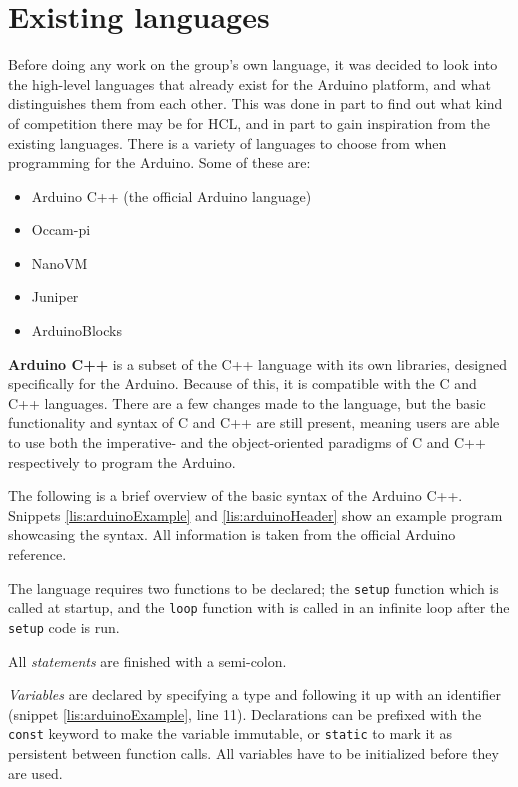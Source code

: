 \section{Existing languages}
Before doing any work on the group's own language, it was decided to look into the high-level languages that already exist for the Arduino platform, and what distinguishes them from each other.
This was done in part to find out what kind of competition there may be for HCL, and in part to gain inspiration from the existing languages.
There is a variety of languages to choose from when programming for the Arduino.
Some of these are:

\begin{itemize}
	\item Arduino C++ (the official Arduino language)
	\item Occam-pi
	\item NanoVM
	\item Juniper
	\item ArduinoBlocks
\end{itemize}

\textbf{Arduino C++} is a subset of the C++ language with its own libraries, designed specifically for the Arduino.
Because of this, it is compatible with the C and C++ languages.
There are a few changes made to the language, but the basic functionality and syntax of C and C++ are still present, meaning users are able to use both the imperative- and the object-oriented paradigms of C and C++ respectively to program the Arduino.

The following is a brief overview of the basic syntax of the Arduino C++.
Snippets \ref{lis:arduinoExample} and \ref{lis:arduinoHeader} show an example program showcasing the syntax.
All information is taken from the official Arduino reference\cite{ArduinoReference}.

The language requires two functions to be declared;
the \texttt{setup} function which is called at startup,
and the \texttt{loop} function with is called in an infinite loop after the \texttt{setup} code is run.

All \textit{statements} are finished with a semi-colon.

\textit{Variables} are declared by specifying a type and following it up with an identifier (snippet \ref{lis:arduinoExample}, line 11).
Declarations can be prefixed with the \texttt{const} keyword to make the variable immutable, or \texttt{static} to mark it as persistent between function calls.
All variables have to be initialized before they are used. 

